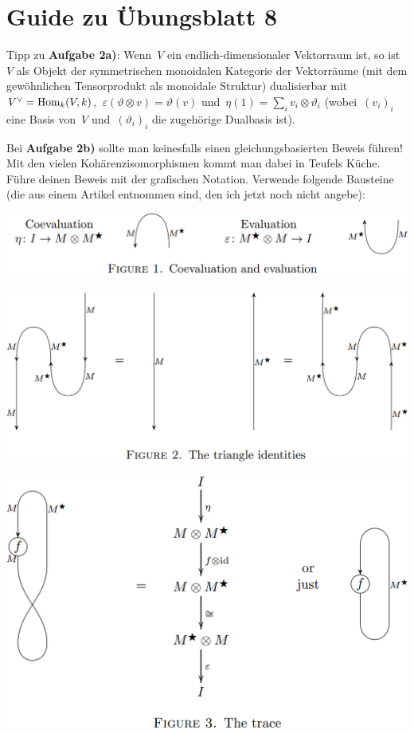 \documentclass{uebblatt}
\begin{document}
\section*{Guide zu Übungsblatt 8}

Tipp zu \textbf{Aufgabe 2a)}: Wenn~$V$ ein endlich-dimensionaler Vektorraum ist,
so ist~$V$ als Objekt der symmetrischen monoidalen Kategorie der Vektorräume
(mit dem gewöhnlichen Tensorprodukt als monoidale Struktur) dualisierbar
mit~$V^\vee = \mathrm{Hom}_k(V,k)$,~$\varepsilon(\vartheta \otimes v) =
\vartheta(v)$ und~$\eta(1) = \sum_i v_i \otimes \vartheta_i$ (wobei~$(v_i)_i$
eine Basis von~$V$ und~$(\vartheta_i)_i$ die zugehörige Dualbasis ist).

Bei \textbf{Aufgabe 2b)} sollte man keinesfalls einen gleichungsbasierten
Beweis führen! Mit den vielen Kohärenzisomorphismen kommt man dabei in Teufels
Küche. Führe deinen Beweis mit der grafischen Notation. Verwende folgende
Bausteine (die aus einem Artikel entnommen sind, den ich jetzt noch nicht
angebe):

\begin{center}
  \includegraphics[scale=0.3]{images/ponto-shulman-1}

  \includegraphics[scale=0.3]{images/ponto-shulman-2}

  \includegraphics[scale=0.3]{images/ponto-shulman-3}
\end{center}
\end{document}
